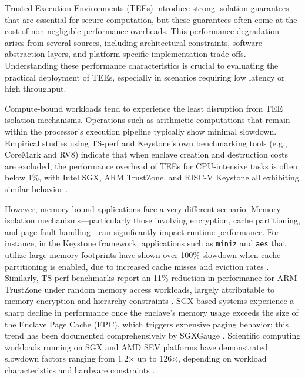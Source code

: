 Trusted Execution Environments (TEEs) introduce strong isolation guarantees that are essential for secure computation, but these guarantees often come at the cost of non-negligible performance overheads. This performance degradation arises from several sources, including architectural constraints, software abstraction layers, and platform-specific implementation trade-offs. Understanding these performance characteristics is crucial to evaluating the practical deployment of TEEs, especially in scenarios requiring low latency or high throughput.

Compute-bound workloads tend to experience the least disruption from TEE isolation mechanisms. Operations such as arithmetic computations that remain within the processor’s execution pipeline typically show minimal slowdown. Empirical studies using TS-perf and Keystone’s own benchmarking tools (e.g., CoreMark and RV8) indicate that when enclave creation and destruction costs are excluded, the performance overhead of TEEs for CPU-intensive tasks is often below 1\%, with Intel SGX, ARM TrustZone, and RISC-V Keystone all exhibiting similar behavior \cite{Suzaki2021,dayeol2019keystone}.

However, memory-bound applications face a very different scenario. Memory isolation mechanisms—particularly those involving encryption, cache partitioning, and page fault handling—can significantly impact runtime performance. For instance, in the Keystone framework, applications such as \texttt{miniz} and \texttt{aes} that utilize large memory footprints have shown over 100\% slowdown when cache partitioning is enabled, due to increased cache misses and eviction rates \cite{dayeol2019keystone}. Similarly, TS-perf benchmarks report an 11\% reduction in performance for ARM TrustZone under random memory access workloads, largely attributable to memory encryption and hierarchy constraints \cite{Suzaki2021}. SGX-based systems experience a sharp decline in performance once the enclave's memory usage exceeds the size of the Enclave Page Cache (EPC), which triggers expensive paging behavior; this trend has been documented comprehensively by SGXGauge \cite{kumar2022sgxgauge}. Scientific computing workloads running on SGX and AMD SEV platforms have demonstrated slowdown factors ranging from 1.2× up to 126×, depending on workload characteristics and hardware constraints \cite{akkram2020scientific}.

